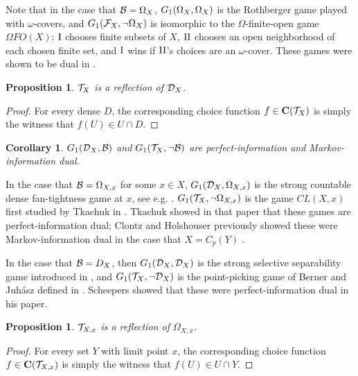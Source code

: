 \documentclass{amsart}
\theoremstyle{plain}
\newtheorem{corollary}[theorem]{Corollary}
\newtheorem{proposition}[theorem]{Proposition}
\theoremstyle{definition}
\theoremstyle{remark}
\theoremstyle{plain}
\theoremstyle{definition}
\theoremstyle{remark}
\begin{document}
Note that in the case that \(\mathcal{B}=\Omega_X\), \(G_{1}(\Omega_X,\Omega_X)\) is the Rothberger
game played with \(\omega\)-covers, and \(G_{1}(\mathcal{F}_X,\neg\Omega_X)\) is isomorphic
to the \(\Omega\)-finite-open game \(\Omega FO(X)\): \(\mathrm{I}\) chooses finite subsets of \(X\), \(\mathrm{II}\) chooses an open neighborhood
of each chosen finite set, and \(\mathrm{I}\) wins if \(\mathrm{II}\)'s choices are an \(\omega\)-cover.
These games were shown to be dual in \cite{2018arXiv180606001C}.

\begin{proposition}
  \(\mathcal{T}_X\) is a reflection of \(\mathcal{D}_X\).
\end{proposition}
\begin{proof}
  For every dense \(D\), the corresponding choice function \(f\in\mathbf C(\mathcal{T}_X)\) is simply
  the witness that \(f(U)\in U\cap D\).
\end{proof}

\begin{corollary}
  \(G_{1}(\mathcal{D}_X,\mathcal{B})\) and \(G_{1}(\mathcal{T}_X,\neg\mathcal{B})\) are perfect-information
  and Markov-information dual.
\end{corollary}

In the case that \(\mathcal{B}=\Omega_{X,x}\) for some \(x\in X\), \(G_{1}(\mathcal{D}_X,\Omega_{X,x})\) is
the strong countable dense fan-tightness game at \(x\), see e.g. \cite{MR2678950}. \(G_{1}(\mathcal{T}_X,\neg\Omega_{X,x})\)
is the game \(CL(X,x)\) first studied by Tkachuk in \cite{tkachukTwoPointGame}. Tkachuk showed in that paper
that these games are perfect-information dual; Clontz and Holshouser previously showed these were Markov-information
dual in the case that \(X=C_p(Y)\)  \cite{2018arXiv180606001C}.

In the case that \(\mathcal{B}=D_X\), then \(G_{1}(\mathcal{D}_X,\mathcal{D}_X)\) is the strong selective
separability game introduced in \cite{MR1711901}, and \(G_{1}(\mathcal{T}_X,\neg\mathcal{D}_X)\) is the
point-picking game of Berner and Juh\'asz defined in \cite{MR775687}. Scheepers showed that these
were perfect-information dual in his paper.

\begin{proposition}
  \(\mathcal{T}_{X,x}\) is a reflection of \(\Omega_{X,x}\).
\end{proposition}
\begin{proof}
  For every set \(Y\) with limit point \(x\), the corresponding choice function \(f\in\mathbf C(\mathcal{T}_{X,x})\) is simply
  the witness that \(f(U)\in U\cap Y\).
\end{proof}
\end{document}
